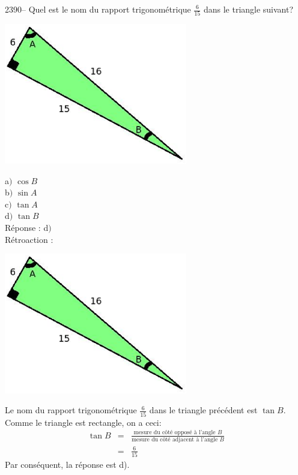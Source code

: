 \documentclass[letterpaper, 12pt]{article}
\begin{document}
2390-- Quel est le nom du rapport trigonom\'etrique $\frac{6}{15}$ dans le triangle suivant?\\
\begin{center}
 \includegraphics[width=8cm,bb=14 14 415 315]{Q2389.eps}
\end{center}
a$)$ $\cos{B}$\\
b$)$ $\sin{A}$\\
c$)$ $\tan{A}$\\
d$)$ $\tan{B}$\\

R\'eponse : d$)$\\

R\'etroaction :\\
\begin{center}
 \includegraphics[width=8cm,bb=14 14 415 315]{Q2389.eps}
\end{center}
Le nom du rapport trigonom\'etrique $\frac{6}{15}$ dans le triangle pr\'ec\'edent est $\tan{B}$. Comme le triangle est rectangle, on a ceci:
\begin{eqnarray*}
  \tan{B}&=&\frac{\textrm{mesure du c\^ot\'e oppos\'e \`a l'angle $B$}}{\textrm{mesure du c\^ot\'e adjacent \`a l'angle $B$}}\\[2mm]
&=&\frac{6}{15}
\end{eqnarray*}
Par cons\'equent, la r\'eponse est d).\\
\end{document}
